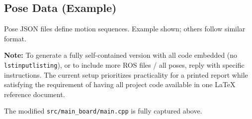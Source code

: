 % 

\subsection*{Pose Data (Example)}
Pose JSON files define motion sequences. Example shown; others follow similar format.




\vspace{1em}
\noindent \textbf{Note:} To generate a fully self-contained version with all code embedded (no \texttt{lstinputlisting}), or to include more ROS files / all poses, reply with specific instructions. The current setup prioritizes practicality for a printed report while satisfying the requirement of having all project code available in one LaTeX reference document. 

The modified \texttt{src/main_board/main.cpp} is fully captured above.

